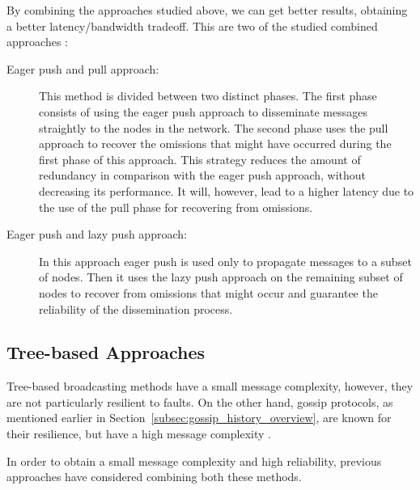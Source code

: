 By combining the approaches studied above, we can get better results, obtaining a better
latency/bandwidth tradeoff. This are two of the studied combined approaches \cite{Carvalho2007}:
\begin{description}
      \item[Eager push and pull approach:] This method is divided between two distinct phases.
            The first phase consists of using the eager push approach to disseminate messages
            straightly to the nodes in the network. The second phase uses the pull approach to
            recover the omissions that might have occurred during the first phase of this
            approach. This strategy reduces the amount of redundancy in comparison with the
            eager push approach, without decreasing its performance. It will, however, lead to
            a higher latency due to the use of the pull phase for recovering from omissions.
      \item[Eager push and lazy push approach:] In this approach eager push is used only to
            propagate messages to a subset of nodes. Then it uses the lazy push approach on
            the remaining subset of nodes to recover from omissions that might occur and
            guarantee the reliability of the dissemination process.
\end{description}


\subsection{Tree-based Approaches}
\label{subsec:gossip_tree_based_approaches}
Tree-based broadcasting methods have a small message complexity, however, they are not
particularly resilient to faults. On the other hand, gossip protocols, as mentioned earlier
in Section~\ref{subsec:gossip_history_overview}, are known for their resilience, but have a
high message complexity \cite{Leitao2007Tree}.

In order to obtain a small message complexity and high reliability, previous approaches have
considered combining both these methods.

